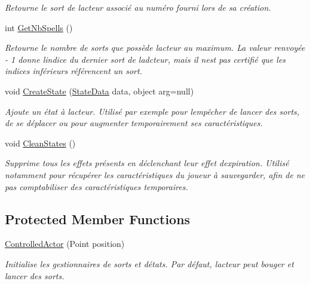 \begin{DoxyCompactItemize}
\begin{DoxyCompactList}\small\item\em Retourne le sort de l\textquotesingle{}acteur associé au numéro fourni lors de sa création. \end{DoxyCompactList}\item 
int \hyperlink{class_tentacle_slicers_1_1actors_1_1_controlled_actor_aa98186daa9934f26ffa8a1cb06b1cbc8}{Get\+Nb\+Spells} ()
\begin{DoxyCompactList}\small\item\em Retourne le nombre de sorts que possède l\textquotesingle{}acteur au maximum. La valeur renvoyée -\/ 1 donne l\textquotesingle{}indice du dernier sort de l\textquotesingle{}adcteur, mais il n\textquotesingle{}est pas certifié que les indices inférieurs référencent un sort. \end{DoxyCompactList}\item 
void \hyperlink{class_tentacle_slicers_1_1actors_1_1_controlled_actor_a1a596b1707287204516bbd7e5489fd85}{Create\+State} (\hyperlink{class_tentacle_slicers_1_1states_1_1_state_data}{State\+Data} data, object arg=null)
\begin{DoxyCompactList}\small\item\em Ajoute un état à l\textquotesingle{}acteur. Utilisé par exemple pour l\textquotesingle{}empêcher de lancer des sorts, de se déplacer ou pour augmenter temporairement ses caractéristiques. \end{DoxyCompactList}\item 
void \hyperlink{class_tentacle_slicers_1_1actors_1_1_controlled_actor_ae47a0e6c043c7ad9f3baa49e46fda3c2}{Clean\+States} ()
\begin{DoxyCompactList}\small\item\em Supprime tous les effets présents en déclenchant leur effet d\textquotesingle{}expiration. Utilisé notamment pour récupérer les caractéristiques du joueur à sauvegarder, afin de ne pas comptabiliser des caractéristiques temporaires. \end{DoxyCompactList}\end{DoxyCompactItemize}
\subsection*{Protected Member Functions}
\begin{DoxyCompactItemize}
\item 
\hyperlink{class_tentacle_slicers_1_1actors_1_1_controlled_actor_ae314ebe27f3a906ca6aff7b0f290d278}{Controlled\+Actor} (Point position)
\begin{DoxyCompactList}\small\item\em Initialise les gestionnaires de sorts et d\textquotesingle{}états. Par défaut, l\textquotesingle{}acteur peut bouger et lancer des sorts. \end{DoxyCompactList}\end{DoxyCompactItemize}
